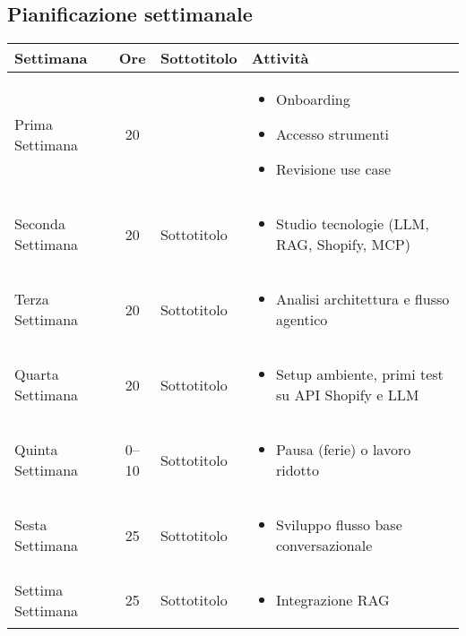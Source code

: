 \subsection{Pianificazione settimanale}

\begin{tabularx}{\textwidth}{@{}l c l X@{}}
\toprule
\textbf{Settimana} & \textbf{Ore} & \textbf{Sottotitolo} & \textbf{Attività} \\
\midrule
Prima Settimana & 20 & & 
    \begin{itemize}
    \item Onboarding
    \item Accesso strumenti
    \item Revisione use case
    \end{itemize} \\

Seconda Settimana & 20 & Sottotitolo & 
    \begin{itemize}
    \item Studio tecnologie (LLM, RAG, Shopify, MCP)
    \end{itemize} \\

Terza Settimana & 20 & Sottotitolo & 
    \begin{itemize}
    \item Analisi architettura e flusso agentico
    \end{itemize} \\

Quarta Settimana & 20 & Sottotitolo & 
    \begin{itemize}
    \item Setup ambiente, primi test su API Shopify e LLM
    \end{itemize} \\

Quinta Settimana & 0--10 & Sottotitolo & 
    \begin{itemize}
    \item Pausa (ferie) o lavoro ridotto
    \end{itemize} \\

Sesta Settimana & 25 & Sottotitolo & 
    \begin{itemize}
    \item Sviluppo flusso base conversazionale
    \end{itemize} \\

Settima Settimana & 25 & Sottotitolo & 
    \begin{itemize}
    \item Integrazione RAG
    \end{itemize} \\


\end{tabularx}
